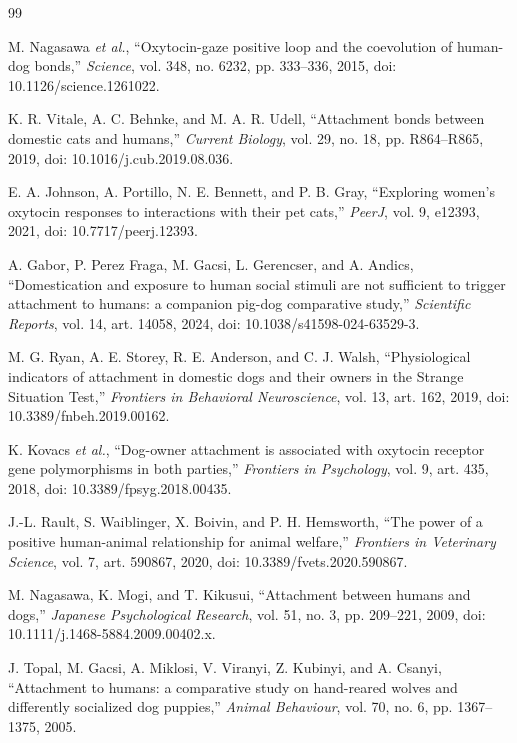 \documentclass[conference]{IEEEtran}
\begin{document}
\begin{thebibliography}{99}

M. Nagasawa \emph{et al.}, ``Oxytocin-gaze positive loop and the coevolution of human-dog bonds,'' \emph{Science}, vol. 348, no. 6232, pp. 333--336, 2015, doi: 10.1126/science.1261022.

K. R. Vitale, A. C. Behnke, and M. A. R. Udell, ``Attachment bonds between domestic cats and humans,'' \emph{Current Biology}, vol. 29, no. 18, pp. R864--R865, 2019, doi: 10.1016/j.cub.2019.08.036.

E. A. Johnson, A. Portillo, N. E. Bennett, and P. B. Gray, ``Exploring women's oxytocin responses to interactions with their pet cats,'' \emph{PeerJ}, vol. 9, e12393, 2021, doi: 10.7717/peerj.12393.

A. Gabor, P. Perez Fraga, M. Gacsi, L. Gerencser, and A. Andics, ``Domestication and exposure to human social stimuli are not sufficient to trigger attachment to humans: a companion pig-dog comparative study,'' \emph{Scientific Reports}, vol. 14, art. 14058, 2024, doi: 10.1038/s41598-024-63529-3.

M. G. Ryan, A. E. Storey, R. E. Anderson, and C. J. Walsh, ``Physiological indicators of attachment in domestic dogs and their owners in the Strange Situation Test,'' \emph{Frontiers in Behavioral Neuroscience}, vol. 13, art. 162, 2019, doi: 10.3389/fnbeh.2019.00162.

K. Kovacs \emph{et al.}, ``Dog-owner attachment is associated with oxytocin receptor gene polymorphisms in both parties,'' \emph{Frontiers in Psychology}, vol. 9, art. 435, 2018, doi: 10.3389/fpsyg.2018.00435.

J.-L. Rault, S. Waiblinger, X. Boivin, and P. H. Hemsworth, ``The power of a positive human-animal relationship for animal welfare,'' \emph{Frontiers in Veterinary Science}, vol. 7, art. 590867, 2020, doi: 10.3389/fvets.2020.590867.

M. Nagasawa, K. Mogi, and T. Kikusui, ``Attachment between humans and dogs,'' \emph{Japanese Psychological Research}, vol. 51, no. 3, pp. 209--221, 2009, doi: 10.1111/j.1468-5884.2009.00402.x.

J. Topal, M. Gacsi, A. Miklosi, V. Viranyi, Z. Kubinyi, and A. Csanyi, ``Attachment to humans: a comparative study on hand-reared wolves and differently socialized dog puppies,'' \emph{Animal Behaviour}, vol. 70, no. 6, pp. 1367--1375, 2005.


\end{thebibliography}
\end{document}
